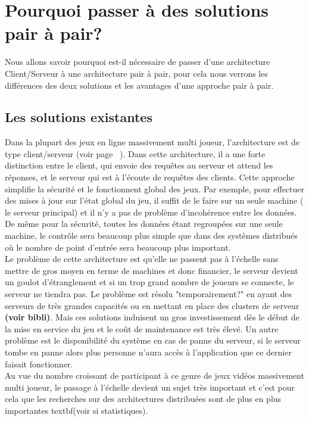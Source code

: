 \section{Pourquoi passer à des solutions pair à pair?}
	\label{whyp2p}
	Nous allons savoir pourquoi est-il nécessaire de passer d'une architecture Client/Serveur à une architecture pair à pair, pour cela nous verrons les différences des deux solutions et les avantages d'une approche pair à pair.
	\subsection{Les solutions existantes}
	Dans la plupart des jeux en ligne massivement multi joueur, l'architecture est de type client/serveur (voir page ~\pageref{P2P/ClServ}). Dans cette architecture, il a une forte distinction entre le client, qui envoie des requêtes au serveur et attend les réponses, et le serveur qui est à l'écoute de requêtes des clients. Cette approche simplifie la sécurité et le fonctionnent global des jeux. Par exemple, pour effectuer des mises à jour sur l'état global du jeu, il suffit de le faire sur un seule machine ( le serveur principal) et il n'y a pas de problème d'incohérence entre les données. De même pour la sécurité, toutes les données étant regroupées sur une seule machine, le contrôle sera beaucoup plus simple que dans des systèmes distribués où le nombre de point d'entrée sera beaucoup plus important. \\
	Le problème de cette architecture est qu'elle ne passent pas à l'échelle sans mettre de gros moyen en terme de machines et donc financier, le serveur devient un goulot d'étranglement et si un trop grand nombre de joueurs se connecte, le serveur ne tiendra pas. Le problème est résolu "temporairement?" en ayant des serveurs de très grandes capacités ou en mettant en place des clusters de serveur \textbf{(voir bibli)}. Mais ces solutions induisent un gros investissement dès le début de la mise en service du jeu et le coût de maintenance est très élevé. Un autre problème est le disponibilité du système en cas de panne du serveur, si le serveur tombe en panne alors plus personne n'aura accès à l'application que ce dernier faisait fonctionner. \\
	Au vue du nombre croissant de participant à ce genre de jeux vidéos massivement multi joueur, le passage à l'échelle devient un sujet très important et c'est pour cela que les recherches sur des architectures distribuées sont de plus en plus importantes textbf{(voir si statistiques)}. \\
\newline

